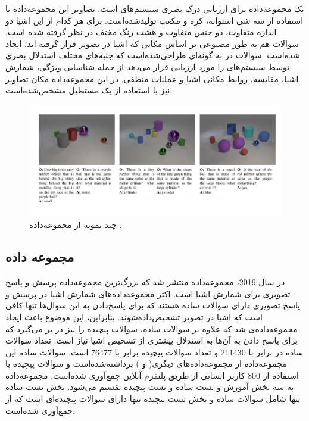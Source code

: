  یک مجموعه‌داده برای ارزیابی درک بصری سیستم‌های 
  است. تصاویر این مجموعه‌داده با استفاده از سه شی استوانه، کره و مکعب تولیدشده‌است. برای هر کدام از این اشیا دو اندازه متفاوت، دو جنس متفاوت و هشت رنگ مختف در نظر گرفته شده است. سوالات هم به طور مصنوعی بر اساس مکانی که اشیا در تصوبر قرار گرفته اند؛ ایجاد شده‌است. سوالات در
   به گونه‌ای طراحی‌شده‌است که جنبه‌های مختلف استدلال بصری توسط سیستم‌های 
   را مورد ارزیابی قرار می‌دهد از جمله شناسایی ویژگی، شمارش اشیا، مقایسه، روابط مکانی اشیا و عملیات منطقی. در این مجموعه‌داده مکان تصاویر نیز با استفاده از یک مستطیل مشخص‌شده‌است.
   
   \begin{figure}[h]
   	\centerline{\includegraphics[scale=0.4]{images/CLEVR.JPG}}
   	\caption[چند نمونه از مجموعه‌داده]{چند نمونه از مجموعه‌داده \cite{johnson2017clevr}.}
   	\label{fig:CLEVRExample}
   \end{figure}

\subsection[مجموعه داده \lr{Tally-QA}]{مجموعه داده \cite{acharya2019tallyqa}}

	در سال 2019، مجموعه‌داده 
منتشر شد که بزرگ‌ترین مجموعه‌داده پرسش و پاسخ تصویری برای شمارش اشیا است. اکثر مجموعه‌داده‌های شمارش اشیا در پرسش و پاسخ تصویری دارای سوالات ساده هستند که برای پاسخ‌دادن به این سوال‌‌ها تنها کافی است که اشیا در تصویر تشخیص‌داده‌شوند. بنابراین، این موضوع باعث ایجاد مجموعه‌داده‌ی 
  شد که علاوه بر سوالات ساده، سوالات پیچیده را نیز در بر می‌گیرد که برای پاسخ دادن به آن‌ها به استدلال بیشتری از تشخیص اشیا نیاز است. تعداد سوالات ساده در
  برابر با 211430 و تعداد سوالات پیچیده برابر با 76477 است. سوالات ساده این مجموعه‌داده از مجموعه‌داده‌های دیگری( 
   \cite{goyal2017making}
  و 
   \cite{krishna2017visual}
  ) برداشته‌شده‌است و سوالات پیچیده با استفاده از 800 کاربر انسانی از طریق پلتفرم آنلاین 
  جمع‌آوری شده‌است. مجموعه‌داده 
  به سه بخش آموزش و تست-ساده و تست-پیچیده تقسیم می‌شود. بخش تست-ساده تنها شامل سوالات ساده و بخش تست-پیچیده تنها دارای سوالات پیچیده‌ای است که از 
  جمع‌آوری شده‌است. 

